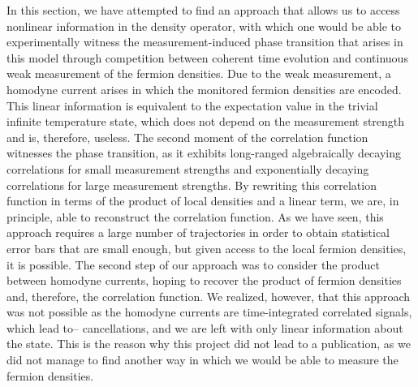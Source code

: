 In this section, we have attempted to find an approach that allows us to access nonlinear information in the density operator, with which one would be able to experimentally witness the measurement-induced phase transition that arises in this model through competition between coherent time evolution and continuous weak measurement of the fermion densities. Due to the weak measurement, a homodyne current arises in which the monitored fermion densities are encoded. This linear information is equivalent to the expectation value in the trivial infinite temperature state, which does not depend on the measurement strength and is, therefore, useless. The second moment of the correlation function witnesses the phase transition, as it exhibits long-ranged algebraically decaying correlations for small measurement strengths and exponentially decaying correlations for large measurement strengths. By rewriting this correlation function in terms of the product of local densities and a linear term, we are, in principle, able to reconstruct the correlation function. As we have seen, this approach requires a large number of trajectories in order to obtain statistical error bars that are small enough, but given access to the local fermion densities, it is possible. The second step of our approach was to consider the product between homodyne currents, hoping to recover the product of fermion densities and, therefore, the correlation function. We realized, however, that this approach was not possible as the homodyne currents are time-integrated correlated signals, which lead to-- cancellations, and we are left with only linear information about the state. This is the reason why this project did not lead to a publication, as we did not manage to find another way in which we would be able to measure the fermion densities. 


